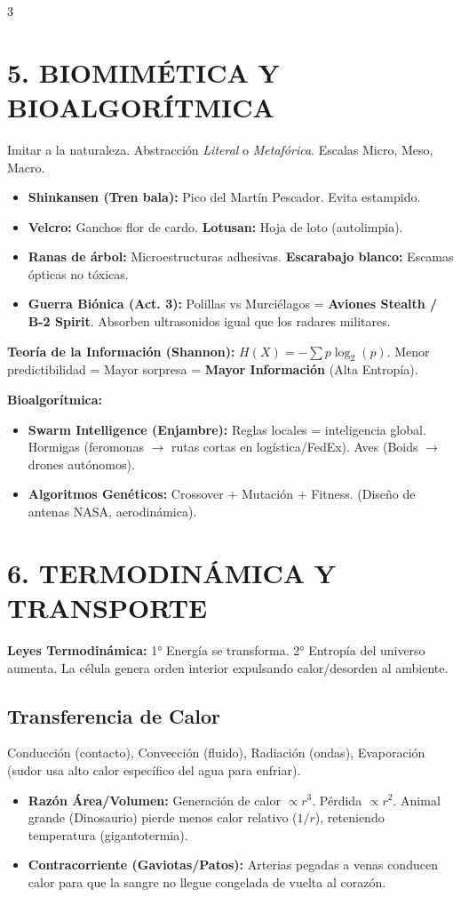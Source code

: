 \documentclass[11pt,landscape,letterpaper]{extarticle}
\begin{document}
\begin{multicols*}{3}
	\section{5. BIOMIMÉTICA Y BIOALGORÍTMICA}
	Imitar a la naturaleza. Abstracción \textit{Literal} o \textit{Metafórica}. Escalas Micro, Meso, Macro.
	\begin{itemize}
		\item \textbf{Shinkansen (Tren bala):} Pico del Martín Pescador. Evita estampido.
		\item \textbf{Velcro:} Ganchos flor de cardo. \textbf{Lotusan:} Hoja de loto (autolimpia).
		\item \textbf{Ranas de árbol:} Microestructuras adhesivas. \textbf{Escarabajo blanco:} Escamas ópticas no tóxicas.
		\item \textbf{Guerra Biónica (Act. 3):} Polillas vs Murciélagos = \textbf{Aviones Stealth / B-2 Spirit}. Absorben ultrasonidos igual que los radares militares.
	\end{itemize}

	\textbf{Teoría de la Información (Shannon):} $H(X) = - \sum p \log_2(p)$.
	Menor predictibilidad = Mayor sorpresa = \textbf{Mayor Información} (Alta Entropía).

	\textbf{Bioalgorítmica:}
	\begin{itemize}
		\item \textbf{Swarm Intelligence (Enjambre):} Reglas locales = inteligencia global. Hormigas (feromonas $\rightarrow$ rutas cortas en logística/FedEx). Aves (Boids $\rightarrow$ drones autónomos).
		\item \textbf{Algoritmos Genéticos:} Crossover + Mutación + Fitness. (Diseño de antenas NASA, aerodinámica).
	\end{itemize}

	\section{6. TERMODINÁMICA Y TRANSPORTE}
	\textbf{Leyes Termodinámica:} 1° Energía se transforma. 2° Entropía del universo aumenta. La célula genera orden interior expulsando calor/desorden al ambiente.

	\subsection{Transferencia de Calor}
	Conducción (contacto), Convección (fluido), Radiación (ondas), Evaporación (sudor usa alto calor específico del agua para enfriar).
	\begin{itemize}
		\item \textbf{Razón Área/Volumen:} Generación de calor $\propto r^3$. Pérdida $\propto r^2$. Animal grande (Dinosaurio) pierde menos calor relativo ($1/r$), reteniendo temperatura (gigantotermia).
		\item \textbf{Contracorriente (Gaviotas/Patos):} Arterias pegadas a venas conducen calor para que la sangre no llegue congelada de vuelta al corazón.
	\end{itemize}


\end{multicols*}
\end{document}
